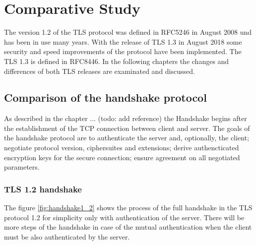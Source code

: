 \chapter{Comparative Study}
\label{chap:comparative_study}

The version 1.2 of the TLS protocol was defined in RFC5246 in August 2008 und has been in use many years. With the release of TLS 1.3 in August 2018 some security and speed improvements of the protocol have been implemented. The TLS 1.3 is defined in RFC8446. In the following chapters the changes and differences of both TLS releases are examinated and discussed.

\section{Comparison of the handshake protocol}
\label{sec:comparison_handshake}

As described in the chapter ... (todo: add reference) the Handshake begins after the establishment of the TCP connection between client and server. The goals of the handshake protocol are to authenticate the server and, optionally, the client; negotiate protocol version, ciphersuites and extensions; derive authencticated encryption keys for the secure connection; ensure agreement on all negotiated parameters. \cite{Hassenstein}

\subsection{TLS 1.2 handshake}
\label{subsec:handshake1_2}

The figure \ref{fig:handshake1_2} shows the process of the full handshake in the TLS protocol 1.2 for simplicity only with authentication of the server. There will be more steps of the handshake in case of the mutual authentication when the client must be also authenticated by the server.

